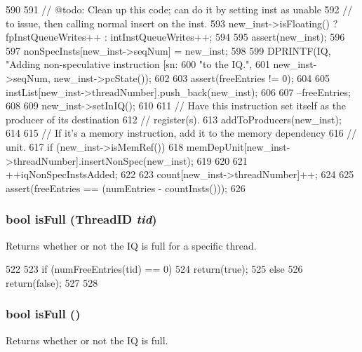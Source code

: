 \begin{DoxyCode}
590 {
591     // @todo: Clean up this code; can do it by setting inst as unable
592     // to issue, then calling normal insert on the inst.
593     new_inst->isFloating() ? fpInstQueueWrites++ : intInstQueueWrites++;
594 
595     assert(new_inst);
596 
597     nonSpecInsts[new_inst->seqNum] = new_inst;
598 
599     DPRINTF(IQ, "Adding non-speculative instruction [sn:%
600             "to the IQ.\n",
601             new_inst->seqNum, new_inst->pcState());
602 
603     assert(freeEntries != 0);
604 
605     instList[new_inst->threadNumber].push_back(new_inst);
606 
607     --freeEntries;
608 
609     new_inst->setInIQ();
610 
611     // Have this instruction set itself as the producer of its destination
612     // register(s).
613     addToProducers(new_inst);
614 
615     // If it's a memory instruction, add it to the memory dependency
616     // unit.
617     if (new_inst->isMemRef()) {
618         memDepUnit[new_inst->threadNumber].insertNonSpec(new_inst);
619     }
620 
621     ++iqNonSpecInstsAdded;
622 
623     count[new_inst->threadNumber]++;
624 
625     assert(freeEntries == (numEntries - countInsts()));
626 }
\end{DoxyCode}
\hypertarget{classInstructionQueue_a30fac732df9b3fda011c7329a112cb31}{
\subsubsection[{isFull}]{\setlength{\rightskip}{0pt plus 5cm}bool isFull ({\bf ThreadID} {\em tid})}}
\label{classInstructionQueue_a30fac732df9b3fda011c7329a112cb31}
Returns whether or not the IQ is full for a specific thread. 


\begin{DoxyCode}
522 {
523     if (numFreeEntries(tid) == 0) {
524         return(true);
525     } else {
526         return(false);
527     }
528 }
\end{DoxyCode}
\hypertarget{classInstructionQueue_a3e70330939fdfc4dbc2f60c1a660584d}{
\subsubsection[{isFull}]{\setlength{\rightskip}{0pt plus 5cm}bool isFull ()}}
\label{classInstructionQueue_a3e70330939fdfc4dbc2f60c1a660584d}
Returns whether or not the IQ is full. 


